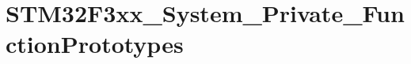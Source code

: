 \hypertarget{group___s_t_m32_f3xx___system___private___function_prototypes}{
\section{STM32F3xx\_\-System\_\-Private\_\-FunctionPrototypes}
\label{group___s_t_m32_f3xx___system___private___function_prototypes}
}
